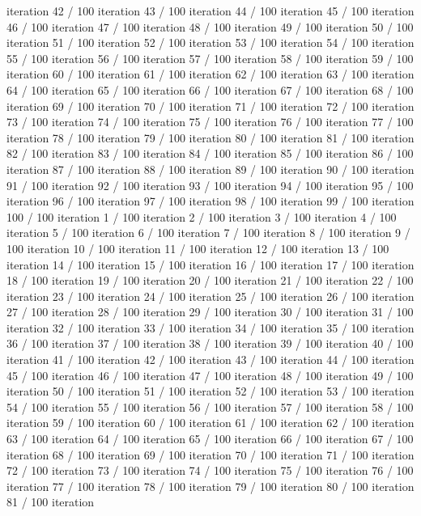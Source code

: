 iteration 42 / 100 iteration 43 / 100 iteration 44 / 100 iteration 45 /
100 iteration 46 / 100 iteration 47 / 100 iteration 48 / 100 iteration
49 / 100 iteration 50 / 100 iteration 51 / 100 iteration 52 / 100
iteration 53 / 100 iteration 54 / 100 iteration 55 / 100 iteration 56 /
100 iteration 57 / 100 iteration 58 / 100 iteration 59 / 100 iteration
60 / 100 iteration 61 / 100 iteration 62 / 100 iteration 63 / 100
iteration 64 / 100 iteration 65 / 100 iteration 66 / 100 iteration 67 /
100 iteration 68 / 100 iteration 69 / 100 iteration 70 / 100 iteration
71 / 100 iteration 72 / 100 iteration 73 / 100 iteration 74 / 100
iteration 75 / 100 iteration 76 / 100 iteration 77 / 100 iteration 78 /
100 iteration 79 / 100 iteration 80 / 100 iteration 81 / 100 iteration
82 / 100 iteration 83 / 100 iteration 84 / 100 iteration 85 / 100
iteration 86 / 100 iteration 87 / 100 iteration 88 / 100 iteration 89 /
100 iteration 90 / 100 iteration 91 / 100 iteration 92 / 100 iteration
93 / 100 iteration 94 / 100 iteration 95 / 100 iteration 96 / 100
iteration 97 / 100 iteration 98 / 100 iteration 99 / 100 iteration 100 /
100 iteration 1 / 100 iteration 2 / 100 iteration 3 / 100 iteration 4 /
100 iteration 5 / 100 iteration 6 / 100 iteration 7 / 100 iteration 8 /
100 iteration 9 / 100 iteration 10 / 100 iteration 11 / 100 iteration 12
/ 100 iteration 13 / 100 iteration 14 / 100 iteration 15 / 100 iteration
16 / 100 iteration 17 / 100 iteration 18 / 100 iteration 19 / 100
iteration 20 / 100 iteration 21 / 100 iteration 22 / 100 iteration 23 /
100 iteration 24 / 100 iteration 25 / 100 iteration 26 / 100 iteration
27 / 100 iteration 28 / 100 iteration 29 / 100 iteration 30 / 100
iteration 31 / 100 iteration 32 / 100 iteration 33 / 100 iteration 34 /
100 iteration 35 / 100 iteration 36 / 100 iteration 37 / 100 iteration
38 / 100 iteration 39 / 100 iteration 40 / 100 iteration 41 / 100
iteration 42 / 100 iteration 43 / 100 iteration 44 / 100 iteration 45 /
100 iteration 46 / 100 iteration 47 / 100 iteration 48 / 100 iteration
49 / 100 iteration 50 / 100 iteration 51 / 100 iteration 52 / 100
iteration 53 / 100 iteration 54 / 100 iteration 55 / 100 iteration 56 /
100 iteration 57 / 100 iteration 58 / 100 iteration 59 / 100 iteration
60 / 100 iteration 61 / 100 iteration 62 / 100 iteration 63 / 100
iteration 64 / 100 iteration 65 / 100 iteration 66 / 100 iteration 67 /
100 iteration 68 / 100 iteration 69 / 100 iteration 70 / 100 iteration
71 / 100 iteration 72 / 100 iteration 73 / 100 iteration 74 / 100
iteration 75 / 100 iteration 76 / 100 iteration 77 / 100 iteration 78 /
100 iteration 79 / 100 iteration 80 / 100 iteration 81 / 100 iteration

